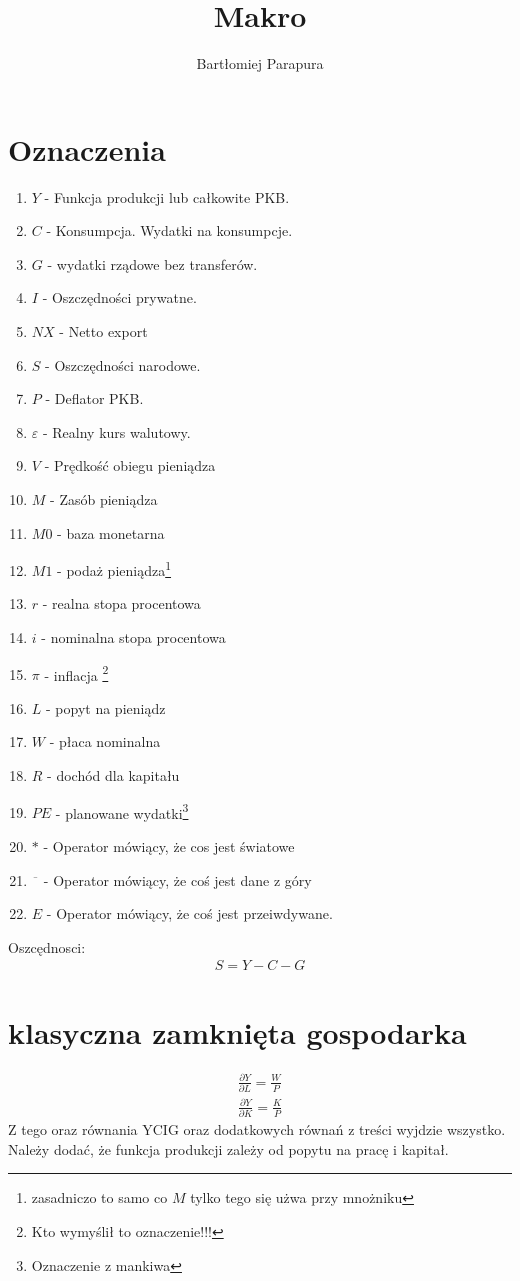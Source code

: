 \documentclass{article}
\title{Makro}
\author{Bartłomiej Parapura}
\begin{document}
\maketitle
\section{Oznaczenia}
\begin{enumerate}
    \item \(Y\) - Funkcja produkcji lub całkowite PKB.
    \item \(C\) - Konsumpcja. Wydatki na konsumpcje.
    \item \(G\) - wydatki rządowe bez transferów.
    \item \(I\) - Oszczędności prywatne.
    \item \(NX\) - Netto export
    \item \(S\) - Oszczędności narodowe.
    \item \(P\) - Deflator PKB.
    \item \(\varepsilon\) - Realny kurs walutowy.
    \item \(V\) - Prędkość obiegu pieniądza
    \item \(M\) - Zasób pieniądza
    \item \(M0\) - baza monetarna
    \item \(M1\) - podaż pieniądza\footnote{zasadniczo to samo co \(M\) tylko tego się użwa przy mnożniku}
    \item \(r\) - realna stopa procentowa
    \item \(i\) - nominalna stopa procentowa
    \item \(\pi\) - inflacja \footnote{Kto wymyślił to oznaczenie!!!}
    \item \(L\) - popyt na pieniądz
    \item \(W\) - płaca nominalna
    \item \(R\) - dochód dla kapitału
    \item \(PE\) - planowane wydatki\footnote{Oznaczenie z mankiwa}
    \item \(*\) - Operator mówiący, że cos jest światowe
    \item \(\overline{\phantom{a}}\) - Operator mówiący, że coś jest dane z góry
    \item \(E\) - Operator mówiący, że coś jest przeiwdywane.
\end{enumerate}
Oszcędnosci:
\begin{gather}
    S = Y - C - G
\end{gather}
\section{klasyczna zamknięta gospodarka}
\begin{gather}
    \frac{\partial Y}{\partial L} = \frac{W}{P}\\
    \frac{\partial Y}{\partial K} = \frac{K}{P}
\end{gather}
Z tego oraz równania YCIG oraz dodatkowych równań z treści wyjdzie wszystko. 
Należy dodać, że funkcja produkcji zależy od popytu na pracę i kapitał.
\end{document}
